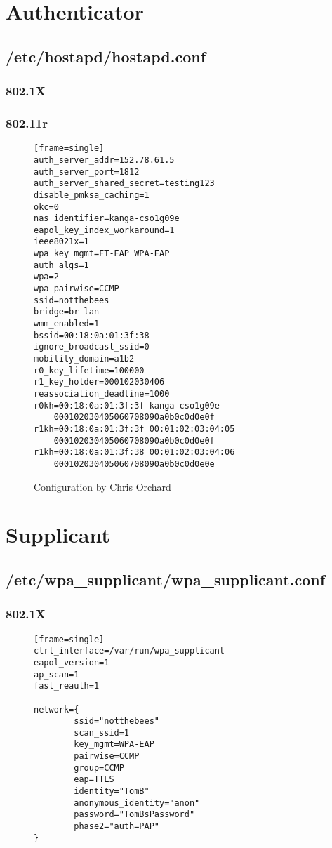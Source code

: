 \section{Authenticator}
\label{sec:Code;sub:authenticator}

\subsection{/etc/hostapd/hostapd.conf}
\subsubsection{802.1X}

\subsubsection{802.11r}
\begin{figure}[h!]
\begin{verbatim}[frame=single]
auth_server_addr=152.78.61.5
auth_server_port=1812
auth_server_shared_secret=testing123
disable_pmksa_caching=1
okc=0
nas_identifier=kanga-cso1g09e
eapol_key_index_workaround=1
ieee8021x=1
wpa_key_mgmt=FT-EAP WPA-EAP
auth_algs=1
wpa=2
wpa_pairwise=CCMP
ssid=notthebees
bridge=br-lan
wmm_enabled=1
bssid=00:18:0a:01:3f:38
ignore_broadcast_ssid=0
mobility_domain=a1b2
r0_key_lifetime=100000
r1_key_holder=000102030406
reassociation_deadline=1000
r0kh=00:18:0a:01:3f:3f kanga-cso1g09e
    000102030405060708090a0b0c0d0e0f
r1kh=00:18:0a:01:3f:3f 00:01:02:03:04:05
    000102030405060708090a0b0c0d0e0f
r1kh=00:18:0a:01:3f:38 00:01:02:03:04:06
    000102030405060708090a0b0c0d0e0e
\end{verbatim}
\caption{Configuration by Chris Orchard}
\end{figure}

\section{Supplicant}
\label{sec:Code;sub:supplicant}

\subsection{/etc/wpa\_supplicant/wpa\_supplicant.conf}
\subsubsection{802.1X}
\begin{figure}[h!]
\begin{verbatim}[frame=single]
ctrl_interface=/var/run/wpa_supplicant
eapol_version=1
ap_scan=1
fast_reauth=1

network={
        ssid="notthebees"
        scan_ssid=1
        key_mgmt=WPA-EAP
        pairwise=CCMP
        group=CCMP
        eap=TTLS
        identity="TomB"
        anonymous_identity="anon"
        password="TomBsPassword"
        phase2="auth=PAP"
}
\end{verbatim}
\end{figure}

